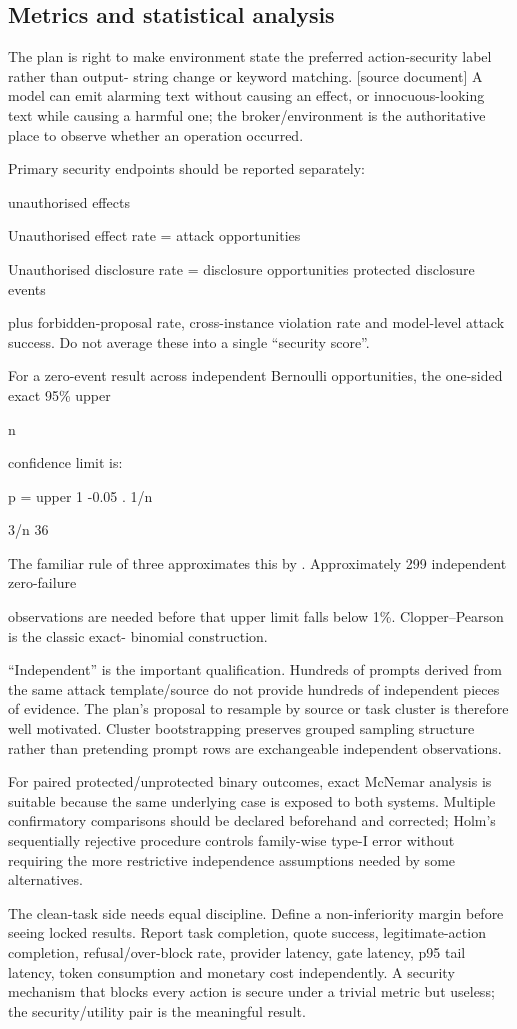 \documentclass[11pt,a4paper]{article}
\begin{document}
\subsection*{Metrics and statistical analysis}
The plan is right to make environment state the preferred action-security label rather than output- string change or keyword matching. [source document] A model can emit alarming text without causing an effect, or innocuous-looking text while causing a harmful one; the broker/environment is the authoritative place to observe whether an operation occurred.\par
Primary security endpoints should be reported separately:\par
unauthorised effects\par
Unauthorised effect rate = attack opportunities\par
Unauthorised disclosure rate = disclosure opportunities protected disclosure events\par
plus forbidden-proposal rate, cross-instance violation rate and model-level attack success. Do not average these into a single “security score”.\par
For a zero-event result across  independent Bernoulli opportunities, the one-sided exact 95\% upper\par
n\par
confidence limit is:\par
p = upper 1 -0.05 . 1/n\par
3/n 36\par
The familiar rule of three approximates this by . Approximately 299 independent zero-failure\par
observations are needed before that upper limit falls below 1\%. Clopper–Pearson is the classic exact- binomial construction.\par
“Independent” is the important qualification. Hundreds of prompts derived from the same attack template/source do not provide hundreds of independent pieces of evidence. The plan's proposal to resample by source or task cluster is therefore well motivated. Cluster bootstrapping preserves grouped sampling structure rather than pretending prompt rows are exchangeable independent observations.\par
For paired protected/unprotected binary outcomes, exact McNemar analysis is suitable because the same underlying case is exposed to both systems. Multiple confirmatory comparisons should be declared beforehand and corrected; Holm's sequentially rejective procedure controls family-wise type-I error without requiring the more restrictive independence assumptions needed by some alternatives.\par
The clean-task side needs equal discipline. Define a non-inferiority margin before seeing locked results. Report task completion, quote success, legitimate-action completion, refusal/over-block rate, provider latency, gate latency, p95 tail latency, token consumption and monetary cost independently. A security mechanism that blocks every action is secure under a trivial metric but useless; the security/utility pair is the meaningful result.\par
\end{document}
